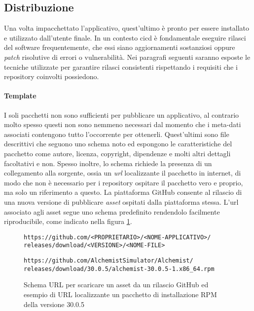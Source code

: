 

\subsection{Distribuzione}

Una volta impacchettato l'applicativo, quest'ultimo è pronto per essere installato e utilizzato dall'utente finale. In un contesto \ac{cicd} è fondamentale eseguire rilasci del software frequentemente, che essi siano aggiornamenti sostanziosi oppure \textit{patch} risolutive di errori o vulnerabilità. Nei paragrafi seguenti saranno esposte le tecniche utilizzate per garantire rilasci consistenti rispettando i requisiti che i repository coinvolti possiedono.

\paragraph{Template} I soli pacchetti non sono sufficienti per pubblicare un applicativo, al contrario molto spesso questi non sono nemmeno necessari dal momento che i meta-dati associati contengono tutto l'occorrente per ottenerli. Quest'ultimi sono file descrittivi che seguono uno schema noto ed espongono le caratteristiche del pacchetto come autore, licenza, copyright, dipendenze e molti altri dettagli facoltativi e non. Spesso inoltre, lo schema richiede la presenza di un collegamento alla sorgente, ossia un \textit{url} localizzante il pacchetto in internet, di modo che non è necessario per i repository ospitare il pacchetto vero e proprio, ma solo un riferimento a questo. La piattaforma GitHub consente al rilascio di una nuova versione di pubblicare \textit{asset} ospitati dalla piattaforma stessa. L'url associato agli asset segue uno schema predefinito rendendolo facilmente riproducibile, come indicato nella figura \ref{fig:github-assets-url}.
\begin{figure}[htb]\label{fig:github-assets-url}
	\centering
	\texttt{https://github.com/<PROPRIETARIO>/<NOME-APPLICATIVO>/\\ \tab releases/download/<VERSIONE>/<NOME-FILE>}
	
	\vspace{0.5cm}
	
	\texttt{https://github.com/AlchemistSimulator/Alchemist/\\ \tab releases/download/30.0.5/alchemist-30.0.5-1.x86\_64.rpm}
	\caption{Schema URL per scaricare un asset da un rilascio GitHub ed esempio di URL localizzante un pacchetto di installazione RPM della versione 30.0.5}
\end{figure}

